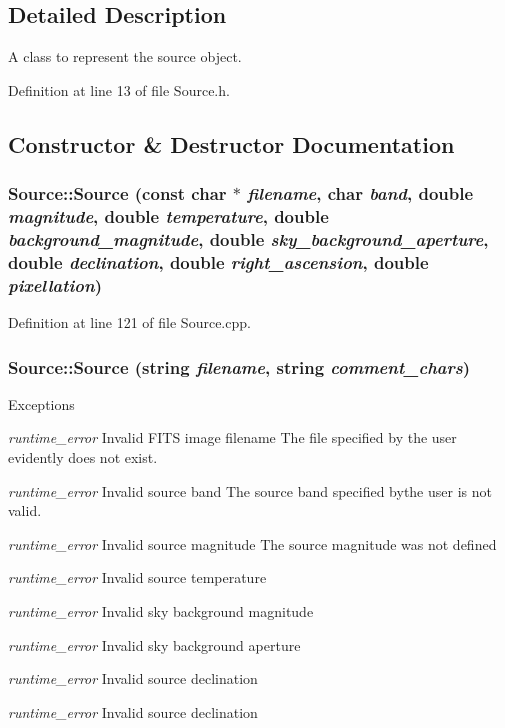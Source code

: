 \subsection{Detailed Description}
A class to represent the source object. 

Definition at line 13 of file Source.h.



\subsection{Constructor \& Destructor Documentation}
\hypertarget{classSource_ac22e28a4b81a37fddf86ca720e93ec08}{
\subsubsection[{Source}]{\setlength{\rightskip}{0pt plus 5cm}Source::Source (const char $\ast$ {\em filename}, \/  char {\em band}, \/  double {\em magnitude}, \/  double {\em temperature}, \/  double {\em background\_\-magnitude}, \/  double {\em sky\_\-background\_\-aperture}, \/  double {\em declination}, \/  double {\em right\_\-ascension}, \/  double {\em pixellation})}}
\label{classSource_ac22e28a4b81a37fddf86ca720e93ec08}


Definition at line 121 of file Source.cpp.

\hypertarget{classSource_a62904da7bc93de0418c16bc3243adc3f}{
\subsubsection[{Source}]{\setlength{\rightskip}{0pt plus 5cm}Source::Source (string {\em filename}, \/  string {\em comment\_\-chars})}}
\label{classSource_a62904da7bc93de0418c16bc3243adc3f}



\begin{DoxyExceptions}{Exceptions}
\item[{\em runtime\_\-error}]Invalid FITS image filename The file specified by the user evidently does not exist.\item[{\em runtime\_\-error}]Invalid source band The source band specified bythe user is not valid.\item[{\em runtime\_\-error}]Invalid source magnitude The source magnitude was not defined\item[{\em runtime\_\-error}]Invalid source temperature\item[{\em runtime\_\-error}]Invalid sky background magnitude\item[{\em runtime\_\-error}]Invalid sky background aperture\item[{\em runtime\_\-error}]Invalid source declination\item[{\em runtime\_\-error}]Invalid source declination\end{DoxyExceptions}




